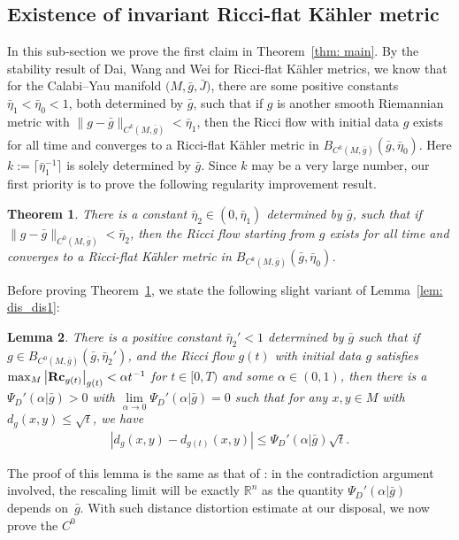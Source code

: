 \documentclass[pdftex]{sigma}
\numberwithin{equation}{section}
\newtheorem{Theorem}{Theorem}[section]
\newtheorem{Lemma}[Theorem]{Lemma}
\newcommand{\Rc}{\operatorname{\bf Rc}}
\begin{document}
\subsection{Existence of invariant Ricci-flat K\"ahler metric}\label{section5.1}
In this sub-section we prove the first claim in Theorem~\ref{thm: main}.
By the stability result \cite{DWW07} of Dai, Wang and Wei for Ricci-flat
K\"ahler metrics, we know that for the Calabi--Yau manifold $\big(M,\bar{g},
\bar{J}\big)$, there are some positive constants $\bar{\eta}_1
<\bar{\eta}_0<1$, both determined by $\bar{g}$, such that if $g$ is
another smooth Riemannian metric with $ \|g-
\bar{g} \|_{C^k(M,\bar{g})} <\bar{\eta}_1$, then the
Ricci flow with initial data $g$ exists for all time and converges to a
Ricci-flat K\"ahler metric in $B_{C^k(M,\bar{g})}(\bar{g},
\bar{\eta}_0)$. Here $k:=\big\lceil \bar{\eta}_1^{-1}
\big\rceil$ is solely determined by $\bar{g}$. Since $k$ may be a very large
number, our first priority is to prove the following regularity improvement
result.
\begin{Theorem}\label{thm: main2}
There is a constant $\bar{\eta}_2\in (0,\bar{\eta}_1)$
determined by $\bar{g}$, such that if $\|g-\bar{g}
\|_{C^0(M,\bar{g})} <\bar{\eta}_2$, then the Ricci
flow starting from $g$ exists for all time and converges to a Ricci-flat
K\"ahler metric in $B_{C^{k}(M,\bar{g})}(\bar{g},\bar{\eta}_0)$.
\end{Theorem}
Before proving Theorem~\ref{thm: main2}, we state the following slight variant
of Lemma~\ref{lem: dis_dis1}:
 \begin{Lemma} \label{lem: dis_dis}
 There is a positive constant $\bar{\eta}_2'<1$ determined by $\bar{g}$ such
 that if $g\in B_{C^0(M,\bar{g})}(\bar{g},\bar{\eta}_2')$, and the Ricci flow
 $g(t)$ with initial data $g$ satisfies $\max_M\left|\Rc_{g(t)} \right|_{g(t)}
 <\alpha t^{-1}$ for $t\in [0,T)$ and some $\alpha\in (0,1)$, then there is a
 $\Psi_D'(\alpha|\bar{g})>0$ with $\lim\limits_{\alpha\to 0}\Psi_D'(\alpha|\bar{g})=0$
 such that for any $x,y\in M$ with $d_g(x,y)\le \sqrt{t}$, we have
 \begin{align*}
 |d_g(x,y)-d_{g(t)}(x,y) | \le \Psi_D'(\alpha|\bar{g})\sqrt{t}.
 \end{align*}
\end{Lemma}
The proof of this lemma is the same as that of \cite[Lemma~2.10]{CRX19}: in
the contradiction argument involved, the rescaling limit will be exactly
$\mathbb{R}^n$ as the quantity $\Psi_D'(\alpha|\bar{g})$ depends on~$\bar{g}$.
With such distance distortion estimate at our disposal, we now prove the $C^0$
\end{document}
